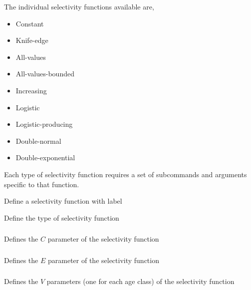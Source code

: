 The individual selectivity functions available are, 

\begin{itemize}
	\item Constant
	\item Knife-edge
	\item All-values
	\item All-values-bounded
	\item Increasing
	\item Logistic
	\item Logistic-producing
	\item Double-normal
	\item Double-exponential
\end{itemize}

Each type of selectivity function requires a set of subcommands and arguments specific to that function.

 {Define a selectivity function with label}

 {Define the type of selectivity function}

\subsubsection[Constant]{}

 {Defines the $C$ parameter of the selectivity function}

\subsubsection[Knife-edge]{}

 {Defines the $E$ parameter of the selectivity function}

\subsubsection[All-values]{}

 {Defines the $V$ parameters (one for each age class) of the selectivity function}

